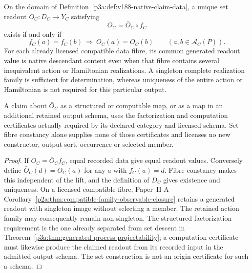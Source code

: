 \documentclass[12pt,a4paper]{article}
\begin{document}
\begin{theorem}
\label{p3a:thm:v188-native-observable-fibre}
On the domain of Definition~\ref{p3a:def:v188-native-claim-data}, a unique
set readout $\bar O_C:D_C\to Y_C$ satisfying
\[
 \boxed{O_C=\bar O_C\circ f_C}
\]
exists if and only if
\[
 \boxed{f_C(a)=f_C(b)\ \Longrightarrow\ O_C(a)=O_C(b)
 \qquad(a,b\in\mathcal A_C(P)).}
\]
For each already licensed compatible data fibre, its common generated
readout value is native descendant content even when that fibre contains
several inequivalent action or Hamiltonian realizations.  A singleton
complete realization family is sufficient for determination, whereas
uniqueness of the entire action or Hamiltonian is not required for this
particular output.

A claim about $\bar O_C$ as a structured or computable map, or as a map in
an additional retained output schema, uses the factorization and computation
certificates actually required by its declared category and licensed schema.
Set fibre constancy alone supplies none of those certificates and licenses
no new constructor, output sort, occurrence or selected member.
\end{theorem}
\begin{proof}
If $O_C=\bar O_Cf_C$, equal recorded data give equal readout values.
Conversely define $\bar O_C(d)=O_C(a)$ for any $a$ with $f_C(a)=d$.
Fibre constancy makes this independent of the lift, and the definition of
$D_C$ gives existence and uniqueness.  On a licensed compatible fibre,
Paper~II-A Corollary~\ref{p2a:thm:compatible-family-observable-closure}
retains a generated readout with singleton image without selecting a member.
The retained action family may consequently remain non-singleton.
The structured factorization requirement is the one already separated from
set descent in Theorem~\ref{p3a:thm:generated-process-projectability}; a
computation certificate must likewise produce the claimed readout from its
recorded input in the admitted output schema.  The set construction is not
an origin certificate for such a schema.
\end{proof}
\end{document}
